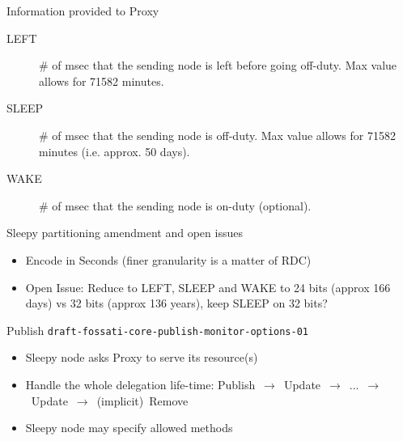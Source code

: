 \documentclass{beamer}
\begin{document}
\begin{frame}[fragile]{Information provided to Proxy}

\begin{description}
 \item[LEFT] \# of msec that the sending node is left before going off-duty.  Max value allows for 71582 minutes.
 \item[SLEEP] \# of msec that the sending node is off-duty.  Max value allows for 71582 minutes (i.e. approx. 50 days).
 \item[WAKE] \# of msec that the sending node is on-duty (optional).
\end{description}
\end{frame}

\begin{frame}{Sleepy partitioning amendment and open issues}

\begin{itemize}
 \item Encode in Seconds (finer granularity is a matter of RDC)
 \item Open Issue: Reduce to LEFT, SLEEP and WAKE to 24 bits (approx 166 days) vs 32 bits (approx 136 years), keep SLEEP on 32 bits?
\end{itemize}


\end{frame}

\begin{frame}{Publish \hspace{5cm} {\tiny \texttt{draft-fossati-core-publish-monitor-options-01}}}

\begin{itemize}
 \item Sleepy node asks Proxy to serve its resource(s)
 \item Handle the whole delegation life-time: \mbox{\small{Publish $\rightarrow$ Update $\rightarrow$ ... $\rightarrow$ Update $\rightarrow$ (implicit) Remove}}
 \item Sleepy node may specify allowed methods %
\end{itemize}

\end{frame}
\end{document}
